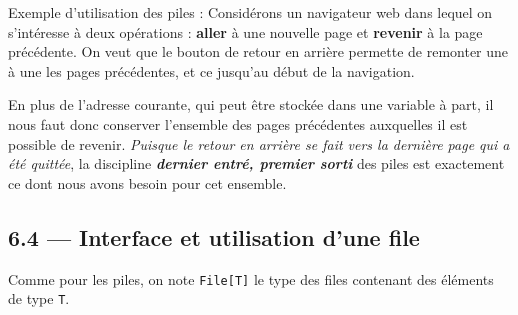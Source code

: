 \documentclass[a4paper,17pt]{extarticle}
\begin{document}
\begin{exemple}
    Exemple d'utilisation des piles : Considérons un navigateur web dans
lequel on s'intéresse à deux opérations : \textbf{aller} à une nouvelle
page et \textbf{revenir} à la page précédente. On veut que le bouton de
retour en arrière permette de remonter une à une les pages précédentes,
et ce jusqu'au début de la navigation.

En plus de l'adresse courante, qui peut être stockée dans une variable à
part, il nous faut donc conserver l'ensemble des pages précédentes
auxquelles il est possible de revenir. \emph{Puisque le retour en
arrière se fait vers la dernière page qui a été quittée}, la discipline
\textbf{\emph{dernier entré, premier sorti}} des piles est exactement ce
dont nous avons besoin pour cet ensemble.

        \end{exemple}
    \hypertarget{interface-et-utilisation-dune-file}{%
\subsection{6.4 --- Interface et utilisation d'une
file}\label{interface-et-utilisation-dune-file}}

    Comme pour les piles, on note \texttt{File{[}T{]}} le type des files
contenant des éléments de type \texttt{T}.
\end{document}
